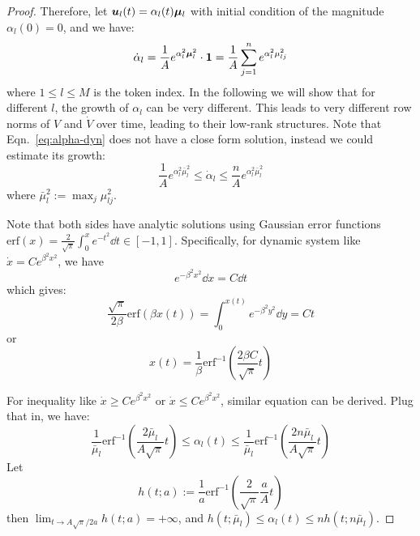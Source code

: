 \begin{proof}
Therefore, let ${\bm{u}}_l(t) = \alpha_l(t) {\bm{\mu}}_l$ with initial condition of the magnitude $\alpha_l(0) = 0$, and we have:
\begin{equation}
    \dot \alpha_l = \frac{1}{A}  e^{\alpha_l^2 {\bm{\mu}}_l^2}\cdot {\bm{1}} = \frac{1}{A} \sum_{j=1}^n e^{\alpha_l^2 \mu^2_{lj}} \label{eq:alpha-dyn}
\end{equation}
where $1\le l\le M$ is the token index. In the following we will show that for different $l$, the growth of $\alpha_l$ can be very different. This leads to very different row norms of $V$ and $\dot V$ over time, leading to their low-rank structures. Note that Eqn.~\ref{eq:alpha-dyn} does not have a close form solution, instead we could estimate its growth:
\begin{equation}
    \frac{1}{A} e^{\alpha_l^2 \bar\mu^2_l}
    \le \dot \alpha_l \le \frac{n}{A} e^{\alpha_l^2 \bar\mu^2_l}
\end{equation}
where $\bar\mu^2_l := \max_j \mu^2_{lj}$. 

\def\erf{\mathrm{erf}}

Note that both sides have analytic solutions using Gaussian error functions $\erf(x) = \frac{2}{\sqrt{\pi}}\int_0^x e^{-t^2}\dd t \in [-1, 1]$. Specifically, for dynamic system like $\dot x = C e^{\beta^2 x^2}$, we have
\begin{equation}
    e^{-\beta^2 x^2} \dd x = C \dd t 
\end{equation}
which gives:
\begin{equation}
    \frac{\sqrt{\pi}}{2\beta} \erf\left(\beta x(t)\right) = 
    \int_0^{x(t)} e^{-\beta^2 y^2} \dd y = C t 
\end{equation}
or 
\begin{equation}
    x(t) = \frac{1}{\beta} \erf^{-1}\left( \frac{2\beta C}{\sqrt{\pi}}t\right)
\end{equation}

For inequality like $\dot x \ge C e^{\beta^2 x^2}$ or $\dot x \le C e^{\beta^2 x^2}$, similar equation can be derived. Plug that in, we have:
\begin{equation}
    \frac{1}{\bar\mu_l} \erf^{-1}\left(\frac{2\bar\mu_l}{A\sqrt{\pi}}t \right)
    \le \alpha_l(t) \le \frac{1}{\bar\mu_l} \erf^{-1}\left(\frac{2n\bar\mu_l}{A\sqrt{\pi}}t \right)
\end{equation}
Let 
\begin{equation}
h(t;a) := \frac{1}{a}\erf^{-1}\left(\frac{2}{\sqrt{\pi}}\frac{a}{A}t\right)   
\end{equation}
then $\lim_{t\rightarrow A \sqrt{\pi} / 2a } h(t;a) = +\infty$, and $h(t;\bar\mu_l) \le \alpha_l(t) \le n h(t; n \bar\mu_l)$. 


\end{proof}
